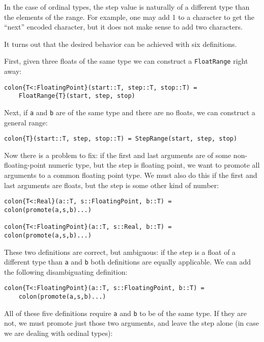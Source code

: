 In the case of ordinal types, the step value is naturally of a different type
than the elements of the range.
For example, one may add 1 to a character to get the ``next'' encoded character,
but it does not make sense to add two characters.

It turns out that the desired behavior can be achieved with six definitions.

First, given three floats of the same type we can construct a \texttt{FloatRange}
right away:

\begin{verbatim}
colon{T<:FloatingPoint}(start::T, step::T, stop::T) =
    FloatRange{T}(start, step, stop)
\end{verbatim}

Next, if \texttt{a} and \texttt{b} are of the same type and there are no floats,
we can construct a general range:

\begin{verbatim}
colon{T}(start::T, step, stop::T) = StepRange(start, step, stop)
\end{verbatim}

Now there is a problem to fix: if the first and last arguments are of some
non-floating-point numeric type, but the step is floating point, we want to
promote all arguments to a common floating point type.
We must also do this if the first and last arguments are floats, but the step
is some other kind of number:

\begin{verbatim}
colon{T<:Real}(a::T, s::FloatingPoint, b::T) = colon(promote(a,s,b)...)

colon{T<:FloatingPoint}(a::T, s::Real, b::T) = colon(promote(a,s,b)...)
\end{verbatim}

These two definitions are correct, but ambiguous: if the step is a float
of a different type than \texttt{a} and \texttt{b} both definitions are
equally applicable.
We can add the following disambiguating definition:

\begin{verbatim}
colon{T<:FloatingPoint}(a::T, s::FloatingPoint, b::T) =
    colon(promote(a,s,b)...)
\end{verbatim}

All of these five definitions require \texttt{a} and \texttt{b} to be of the
same type.
If they are not, we must promote just those two arguments, and leave
the step alone (in case we are dealing with ordinal types):

